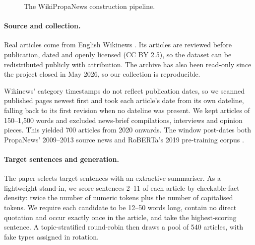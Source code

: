 \documentclass[11pt]{article}
\begin{document}
\begin{figure}[t]
\centering
{}
\caption{The WikiPropaNews construction pipeline.}
\label{fig:pipeline}
\end{figure}

\paragraph{Source and collection.} Real articles come from English Wikinews \citep{wikinews}. Its articles are reviewed before publication, dated and openly licensed (CC BY 2.5), so the dataset can be redistributed publicly with attribution. The archive has also been read-only since the project closed in May 2026, so our collection is reproducible.

Wikinews' category timestamps do not reflect publication dates, so we scanned published pages newest first and took each article's date from its own dateline, falling back to its first revision when no dateline was present. We kept articles of 150--1,500 words and excluded news-brief compilations, interviews and opinion pieces. This yielded 700 articles from 2020 onwards. The window post-dates both PropaNews' 2009--2013 source news and RoBERTa's 2019 pre-training corpus \citep{liu2019roberta}.

\paragraph{Target sentences and generation.} The paper selects target sentences with an extractive summariser. As a lightweight stand-in, we score sentences 2--11 of each article by checkable-fact density: twice the number of numeric tokens plus the number of capitalised tokens. We require each candidate to be 12--50 words long, contain no direct quotation and occur exactly once in the article, and take the highest-scoring sentence. A topic-stratified round-robin then draws a pool of 540 articles, with fake types assigned in rotation.
\end{document}
